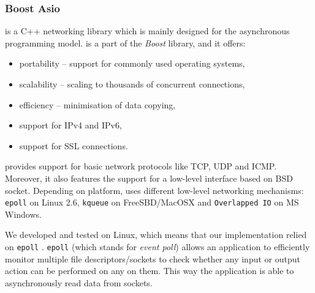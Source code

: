         \subsubsection{Boost Asio}
            \Asio is a C++ networking library which is mainly designed for the asynchronous programming model. \Asio is a part of the \textit{Boost} library, and it offers:
            \begin{itemize}
                \item portability -- support for commonly used operating systems,
                \item scalability -- scaling to thousands of concurrent connections,
                \item efficiency -- minimisation of data copying,
                \item support for IPv4 and IPv6,
                \item support for SSL connections.
            \end{itemize}
            \Asio provides support for basic network protocols like TCP, UDP and ICMP. Moreover, it also features the support for a low-level interface based on BSD socket. Depending on platform, \Asio uses different low-level networking mechanisms: \texttt{epoll} on Linux 2.6, \texttt{kqueue} on FreeSBD/MacOSX and \texttt{Overlapped IO} on MS Windows.
            
            We developed and tested \DHTS on Linux, which means that our implementation relied on \texttt{epoll} \cite{Epoll}. \texttt{epoll} (which stands for \emph{event poll}) allows an application to efficiently monitor multiple file descriptors/sockets to check whether any input or output action can be performed on any on them. This way the application is able to asynchronously read data from sockets.